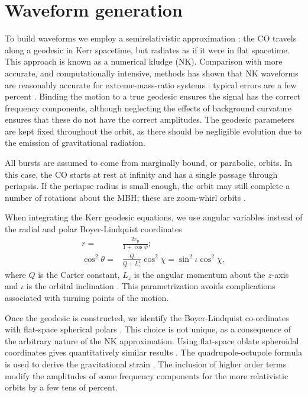 \documentclass[useAMS,usedcolumn,usegraphicx,usenatbib]{mn2e}
\newcommand{\sub}[1]{\ensuremath{_\mathrm{#1}}}
\begin{document}
\section{Waveform generation}\label{sec:Wave}

To build waveforms we employ a semirelativistic approximation \citep{Ruffini1981}: the CO travels along a geodesic in Kerr spacetime, but radiates as if it were in flat spacetime. This approach is known as a numerical kludge (NK). Comparison with more accurate, and computationally intensive, methods has shown that NK waveforms are reasonably accurate for extreme-mass-ratio systems \citep{Gair2005, Babak2007}: typical errors are a few percent \citep{Tanaka1993,Gair2005,Berry2013}. Binding the motion to a true geodesic ensures the signal has the correct frequency components, although neglecting the effects of background curvature ensures that these do not have the correct amplitudes. The geodesic parameters are kept fixed throughout the orbit, as there should be negligible evolution due to the emission of gravitational radiation.

All bursts are assumed to come from marginally bound, or parabolic, orbits. In this case, the CO starts at rest at infinity and has a single passage through periapsis. If the periapse radius is small enough, the orbit may still complete a number of rotations about the MBH; these are zoom-whirl orbits \citep{Glampedakis2002a}.

When integrating the Kerr geodesic equations, we use angular variables instead of the radial and polar Boyer-Lindquist coordinates \citep{Drasco2004}
\begin{align}
r = {} & \frac{2 r\sub{p}}{1 + \cos\psi};\\
\cos^2\theta = {} & \frac{Q}{Q+L_z^2}\cos^2\chi = \sin^2 \iota \cos^2\chi,
\end{align}
where $Q$ is the Carter constant, $L_z$ is the angular momentum about the $z$-axis and $\iota$ is the orbital inclination \citep*{Glampedakis2002}. This parametrization avoids complications associated with turning points of the motion.

Once the geodesic is constructed, we identify the Boyer-Lindquist co-ordinates with flat-space spherical polars \citep{Gair2005, Babak2007}. This choice is not unique, as a consequence of the arbitrary nature of the NK approximation. Using flat-space oblate spheroidal coordinates gives quantitatively similar results \citep{Berry2013}. The quadrupole-octupole formula is used to derive the gravitational strain \citep{Bekenstein1973, Press1977, Yunes2008}. The inclusion of higher order terms modify the amplitudes of some frequency components for the more relativistic orbits by a few tens of percent.
\end{document}
